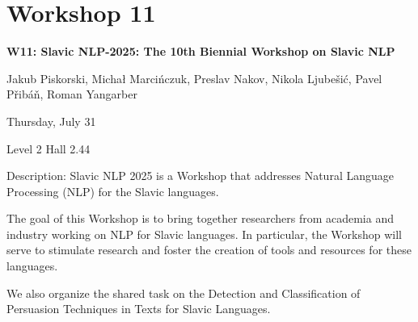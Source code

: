 \clearpage



\section[W11: Slavic NLP-2025: The 10th Biennial Workshop on Slavic NLP]{Workshop 11}

\begin{center}
    {\Large \textbf{W11: Slavic NLP-2025: The 10th Biennial Workshop on Slavic NLP}}

   Jakub Piskorski, Michał Marcińczuk, Preslav Nakov, Nikola Ljubešić, Pavel Přibáň, Roman Yangarber

    Thursday, July 31
    
   Level 2 Hall 2.44

\end{center}

Description: Slavic NLP 2025 is a Workshop that addresses Natural Language Processing (NLP) for the Slavic languages.

The goal of this Workshop is to bring together researchers from academia and industry working on NLP for Slavic languages. In particular, the Workshop will serve to stimulate research and foster the creation of tools and resources for these languages.

We also organize the shared task on the Detection and Classification of Persuasion Techniques in Texts for Slavic Languages.

